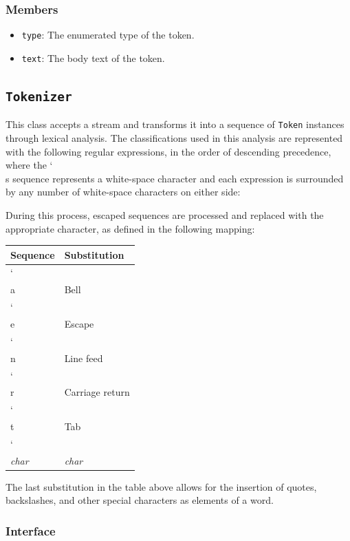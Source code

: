 \documentclass{article}
\newcommand{\bslash}{\char`\\}
\begin{document}
  \subsubsection{Members}
  \begin{itemize}
    \item \texttt{type}: The enumerated type of the token.
    \item \texttt{text}: The body text of the token.
  \end{itemize}

  \subsection{\texttt{Tokenizer}}

  This class accepts a stream and transforms it into a sequence of
  \texttt{Token} instances through lexical analysis.  The
  classifications used in this analysis are represented with the
  following regular expressions, in the order of descending precedence,
  where the \bslash s sequence represents a white-space character and
  each expression is surrounded by any number of white-space characters
  on either side:

  

  During this process, escaped sequences are processed and replaced with
  the appropriate character, as defined in the following mapping:

  \begin{tabular}{l|l}
    Sequence & Substitution \\
    \hline
    \bslash a & Bell \\
    \bslash e & Escape \\
    \bslash n & Line feed \\
    \bslash r & Carriage return \\
    \bslash t & Tab \\
    \bslash \emph{char} & \emph{char}
  \end{tabular}

  The last substitution in the table above allows for the insertion of
  quotes, backslashes, and other special characters as elements of a
  word.

  \subsubsection{Interface}
  
\end{document}
